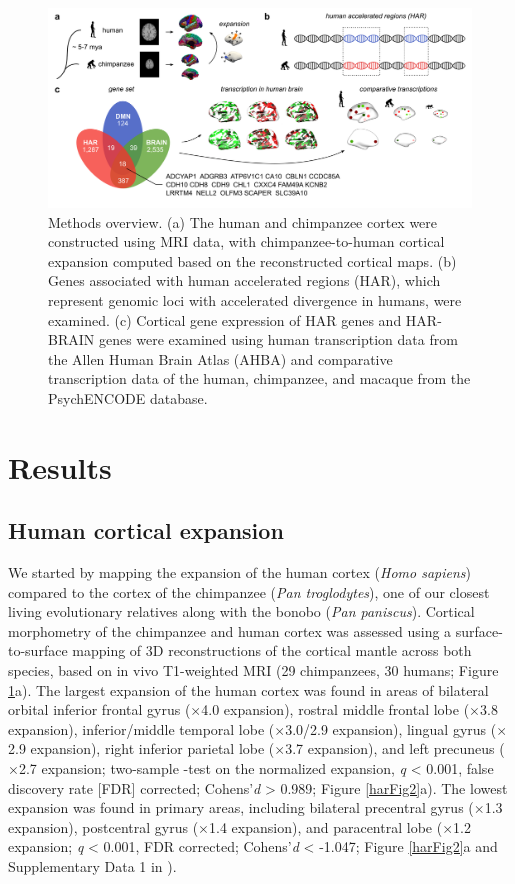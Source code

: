 \begin{refsection}
\begin{figure}[h]
    \centering
    \includegraphics[width=\linewidth]{images/harFig1.png}
    \caption{Methods overview. (a) The human and chimpanzee cortex were constructed using MRI data, with chimpanzee-to-human cortical expansion computed based on the reconstructed cortical maps. (b) Genes associated with human accelerated regions (HAR), which represent genomic loci with accelerated divergence in humans, were examined. (c) Cortical gene expression of HAR genes and HAR-BRAIN genes were examined using human transcription data from the Allen Human Brain Atlas (AHBA) and comparative transcription data of the human, chimpanzee, and macaque from the PsychENCODE database.}
    \label{harFig1}
\end{figure}

\section*{Results}
\subsection*{Human cortical expansion}
We started by mapping the expansion of the human cortex (\textit{Homo sapiens}) compared to the cortex of the chimpanzee (\textit{Pan troglodytes}), one of our closest living evolutionary relatives along with the bonobo (\textit{Pan paniscus}). Cortical morphometry of the chimpanzee and human cortex was assessed using a surface-to-surface mapping of 3D reconstructions of the cortical mantle across both species, based on in vivo T1-weighted MRI (29 chimpanzees, 30 humans; Figure \ref{harFig1}a). The largest expansion of the human cortex was found in areas of bilateral orbital inferior frontal gyrus ($\times$4.0 expansion), rostral middle frontal lobe ($\times$3.8 expansion), inferior/middle temporal lobe ($\times$3.0/2.9 expansion), lingual gyrus ($\times$2.9 expansion), right inferior parietal lobe ($\times$3.7 expansion), and left precuneus ($\times$2.7 expansion; two-sample \tvaldf-test on the normalized expansion, \textit{q} < 0.001, false discovery rate [FDR] corrected; Cohens'\textit{d} > 0.989; Figure \ref{harFig2}a). The lowest expansion was found in primary areas, including bilateral precentral gyrus ($\times$1.3 expansion), postcentral gyrus ($\times$1.4 expansion), and paracentral lobe ($\times$1.2 expansion; \textit{q} < 0.001, FDR corrected; Cohens'\textit{d} < -1.047; Figure \ref{harFig2}a and Supplementary Data 1 in \citep{Wei2019GeneticMA}).


\end{refsection}
